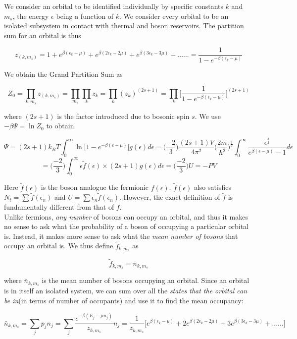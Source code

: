 \documentclass[oneside]{book}
\begin{document}
We consider an orbital to be identified individually by specific constants $k$ and $m_s$, the energy $\epsilon$ being a function of $k$. We consider every orbital to be an isolated subsystem in contact with thermal and boson reservoirs. The partition sum for an orbital is thus

\[z_{(k,m_s)} = 1 + e^{\beta(\epsilon_k - \mu)} + e^{\beta(2\epsilon_k - 2\mu)} + e^{\beta(3\epsilon_k - 3\mu)} +...... = \frac{1}{1 - e^{-\beta(\epsilon_k - \mu)} }\]


We obtain the Grand Partition Sum as

\[Z_0 = \prod_{k,m_s}{}z_{(k,m_s)} = \prod_{m_s}^{}\prod_{k}^{}z_k = \prod_{k}^{}(z_k)^{(2s + 1)} 
= \prod_{k}^{}\Big[\frac{1}{1 - e^{-\beta(\epsilon_k - \mu)} }]^{(2s + 1)} \]

where $(2s+1)$ is the factor introduced due to bosonic spin $s$. We use $-\beta\Psi = \ln Z_0$ to obtain

\[\Psi = {(2s+1)k_BT}\int_{0}^{\infty} \ln\Big[1 - e^{-\beta(\epsilon-\mu)}\Big]g(\epsilon)d\epsilon = \Big(\frac{-2}{3}\Big)\frac{(2s+1)V}{4\pi^2}\Big(\frac{2m}{\hbar^2}\Big)^{\frac{3}{2}}\int_{0}^{\infty} \frac{\epsilon^{\frac{3}{2}}}{e^{\beta(\epsilon-\mu)}-1}d\epsilon \]
\[=    \Big(\frac{-2}{3}\Big)\int_{0}^{\infty}\epsilon \tilde f(\epsilon) \times (2s+1)g(\epsilon)d\epsilon
= \Big(\frac{-2}{3}\Big)U = -PV \]

Here $\tilde f(\epsilon)$ is the boson analogue the fermionic $f(\epsilon)$. $\tilde f(\epsilon)$  also satisfies $N_t = \sum \tilde f(\epsilon_n) $ and $U = \sum \epsilon_n\tilde f(\epsilon_n) $. However, the exact definition of $\tilde f$ is fundamentally different from that of $f$. \\

Unlike fermions, \emph{any number} of bosons can occupy an orbital, and thus it makes no sense to ask what the probability of a boson of occupying a particular orbital is. Instead, it makes more sense to ask what the \emph{mean number of bosons} that occupy an orbital is. We thus define $\tilde f_{k,m_s}$ as

\[ \tilde f_{k,m_s} = \bar n_{k,m_s} \]

where $\bar n_{k,m_s}$ is the mean number of bosons occupying an orbital. Since an orbital is in itself an isolated system, we can sum over all the \emph{states that the orbital can be in}(in terms of number of occupants) and use it to find the mean occupancy:

\[ \bar n_{k,m_s} = \sum_{j}^{} p_jn_j = \sum_{j}^{} \frac{e^{-\beta(E_{j} - \mu n_j)}}{z_{k, m_s}}n_j = \frac{1}{z_{k, m_s}}\Big[ e^{\beta(\epsilon_k - \mu)} + 2e^{\beta(2\epsilon_k - 2\mu)} + 3e^{\beta(3\epsilon_k - 3\mu)} +......         \Big] \]
\end{document}
